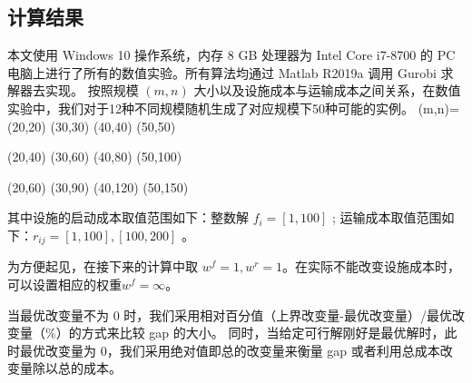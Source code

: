 \documentclass[UTF8]{article}
\begin{document}
\subsection{计算结果}

本文使用 Windows 10 操作系统，内存 8 GB 处理器为 Intel Core i7-8700 的 PC 电脑上进行了所有的数值实验。所有算法均通过 Matlab R2019a 调用 Gurobi 求解器去实现。
按照规模 $(m,n)$ 大小以及设施成本与运输成本之间关系，在数值实验中，我们对于12种不同规模随机生成了对应规模下50种可能的实例。
(m,n)= (20,20) (30,30) (40,40) (50,50)

       (20,40) (30,60) (40,80) (50,100)

       (20,60) (30,90) (40,120) (50,150)

其中设施的启动成本取值范围如下：整数解 $f_i=[1,100]$ ;
    运输成本取值范围如下：$r_{ij}= [1,100],[100,200]$ 。

为方便起见，在接下来的计算中取 $w^f=1,w^r=1$。在实际不能改变设施成本时，可以设置相应的权重$w^f=\infty$。

当最优改变量不为 0 时，我们采用相对百分值（上界改变量-最优改变量）/最优改变量（$\%$）的方式来比较 gap 的大小。
同时，当给定可行解刚好是最优解时，此时最优改变量为 0，我们采用绝对值即总的改变量来衡量 gap 或者利用总成本改变量除以总的成本。
\end{document}
